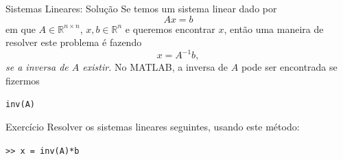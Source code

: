 \documentclass[hyperref={pdfpagelabels=false}]{beamer}
\begin{document}
\begin{frame}{Sistemas Lineares: Solução}
  Se temos um sistema linear dado por
  $$Ax=b$$
  em que $A\in {\mathbb{R}}^{n\times n}$, $x,b \in {\mathbb{R}}^n$ e queremos encontrar $x$, então uma maneira de resolver este problema é fazendo
  $$x = A^{-1}b,$$
  \emph{se a inversa de $A$ existir.}
  \vfill
  No MATLAB, a inversa de $A$ pode ser encontrada se fizermos
  \begin{center}
    {\texttt{inv(A)}}
  \end{center}
\end{frame}

\begin{frame}{Exercício}
  Resolver os sistemas lineares seguintes, usando este método:
  \vfill
  \begin{center} {\texttt{\alert{>>} x = inv(A)*b}} \end{center}
  \vfill
  \begin{itemize}
\end{itemize}
\end{frame}
\end{document}
